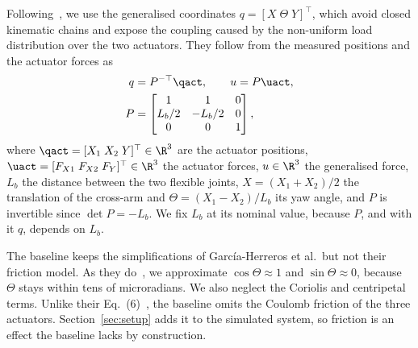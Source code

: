 Following~\cite[Sec.~2.2]{garcia2013model}, we use the generalised coordinates
$q=[X\;\Theta\;Y]^\top$, which avoid closed kinematic chains and expose the
coupling caused by the non-uniform load distribution over the two actuators.
They follow from the measured positions and the actuator forces as
\begin{equation}
\begin{aligned}
  q &= P^{-\top}\qact,
  \qquad
  u = P\uact,\\
  P &=
  \begin{bmatrix}
    1 & 1 & 0\\
    L_b/2 & -L_b/2 & 0\\
    0 & 0 & 1
  \end{bmatrix},
\end{aligned}
\label{eq:Ptransform}
\end{equation}
where $\qact=[X_1\;X_2\;Y]^\top\in\R^3$ are the actuator positions,
$\uact=[F_{X1}\;F_{X2}\;F_Y]^\top\in\R^3$ the actuator forces,
$u\in\R^3$ the generalised force, $L_b$ the distance between the two
flexible joints, $X=(X_1+X_2)/2$ the translation of the cross-arm and
$\Theta=(X_1-X_2)/L_b$ its yaw angle, and $P$ is invertible since
$\det P=-L_b$.
We fix $L_b$ at its nominal value, because $P$, and with it $q$, depends on
$L_b$.

The baseline keeps the simplifications of Garc\'ia-Herreros et al.\ but not
their friction model.
As they do~\cite[Sec.~2.3]{garcia2013model}, we approximate
$\cos\Theta\approx1$ and $\sin\Theta\approx0$, because $\Theta$ stays within
tens of microradians.
We also neglect the Coriolis and centripetal terms.
Unlike their Eq.~(6)~\cite[Sec.~2.2]{garcia2013model}, the baseline omits the
Coulomb friction of the three actuators.
Section~\ref{sec:setup} adds it to the simulated system, so friction is an
effect the baseline lacks by construction.

